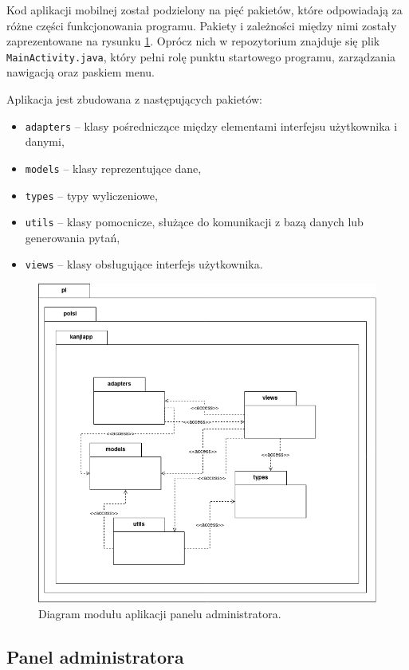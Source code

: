 \documentclass[a4paper,twoside,12pt]{book}
\begin{document}
Kod aplikacji mobilnej został podzielony na pięć pakietów, które odpowiadają za różne części funkcjonowania programu. Pakiety i zależności między nimi zostały zaprezentowane na rysunku \ref{fig:package}. Oprócz nich w repozytorium znajduje się plik \texttt{MainActivity.java}, który pełni rolę punktu startowego programu, zarządzania nawigacją oraz paskiem menu. 

Aplikacja jest zbudowana z następujących pakietów:
\begin{itemize}
\item \texttt{adapters} -- klasy pośredniczące między elementami interfejsu użytkownika i danymi,
\item \texttt{models} -- klasy reprezentujące dane,
\item \texttt{types} -- typy wyliczeniowe,
\item \texttt{utils} -- klasy pomocnicze, służące do komunikacji z bazą danych lub generowania pytań,
\item \texttt{views} -- klasy obsługujące interfejs użytkownika.
\end{itemize} 
\begin{figure}[]
\centering
\includegraphics[width=\textwidth]{packages}
\caption{Diagram modułu aplikacji panelu administratora.}
\label{fig:package}
\end{figure}

\subsection{Panel administratora}
\end{document}
